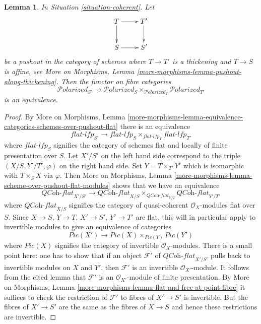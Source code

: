 \documentclass{stacks-project}
\theoremstyle{plain}
\newtheorem{lemma}[subsection]{Lemma}
\theoremstyle{definition}
\theoremstyle{remark}
\numberwithin{equation}{subsection}
\def\Polarizedstack{\mathcal{P}\!\mathit{olarized}}
\begin{document}
\begin{lemma}
\label{lemma-polarized-RS-star}
In Situation \ref{situation-coherent}. Let
$$
\xymatrix{
T \ar[r] \ar[d] & T' \ar[d] \\
S \ar[r] & S'
}
$$
be a pushout in the category of schemes where
$T \to T'$ is a thickening and $T \to S$ is affine, see
More on Morphisms, Lemma \ref{more-morphisms-lemma-pushout-along-thickening}.
Then the functor on fibre categories
$$
\Polarizedstack_{S'}
\longrightarrow
\Polarizedstack_S \times_{\Polarizedstack_T} \Polarizedstack_{T'}
$$
is an equivalence.
\end{lemma}

\begin{proof}
By More on Morphisms, Lemma
\ref{more-morphisms-lemma-equivalence-categories-schemes-over-pushout-flat}
there is an equivalence
$$
\textit{flat-lfp}_{S'}
\longrightarrow
\textit{flat-lfp}_S \times_{\textit{flat-lfp}_T} \textit{flat-lfp}_{T'}
$$
where $\textit{flat-lfp}_S$ signifies the category of schemes flat
and locally of finite presentation over $S$.
Let $X'/S'$ on the left hand side correspond to the triple
$(X/S, Y'/T', \varphi)$ on the right hand side.
Set $Y = T \times_{T'} Y'$ which is isomorphic with
$T \times_S X$ via $\varphi$. Then More on Morphisms, Lemma
\ref{more-morphisms-lemma-scheme-over-pushout-flat-modules}
shows that we have an equivalence
$$
\textit{QCoh-flat}_{X'/S'}
\longrightarrow
\textit{QCoh-flat}_{X/S}
\times_{\textit{QCoh-flat}_{Y/T}} \textit{QCoh-flat}_{Y'/T'}
$$
where $\textit{QCoh-flat}_{X/S}$ signifies the category of
quasi-coherent $\mathcal{O}_X$-modules flat over $S$.
Since $X \to S$, $Y \to T$, $X' \to S'$, $Y' \to T'$ are
flat, this will in particular apply to invertible modules
to give an equivalence of categories
$$
\textit{Pic}(X')
\longrightarrow
\textit{Pic}(X) \times_{\textit{Pic}(Y)} \textit{Pic}(Y')
$$
where $\textit{Pic}(X)$ signifies the category of invertible
$\mathcal{O}_X$-modules. There is a small point here:
one has to show that if an object $\mathcal{F}'$
of $\textit{QCoh-flat}_{X'/S'}$
pulls back to invertible modules on $X$ and $Y'$, then
$\mathcal{F}'$ is an invertible $\mathcal{O}_{X'}$-module.
It follows from the cited lemma that $\mathcal{F}'$
is an $\mathcal{O}_{X'}$-module of finite presentation.
By More on Morphisms, Lemma
\ref{more-morphisms-lemma-flat-and-free-at-point-fibre}
it suffices to check the restriction of
$\mathcal{F}'$ to fibres of $X' \to S'$ is invertible.
But the fibres of $X' \to S'$ are the same as the fibres
of $X \to S$ and hence these restrictions are invertible.


\end{proof}
\end{document}
